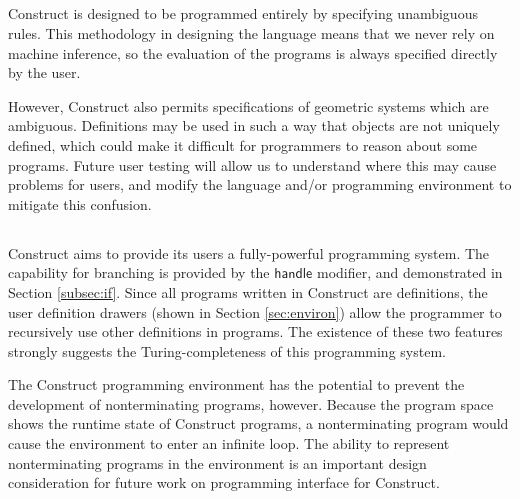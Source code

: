 \documentclass[twoside,openright,11pt]{report}
\begin{document}
\subsection{\constructgoalsnoinfer}

Construct is designed to be programmed entirely by specifying unambiguous rules.
This methodology in designing the language means that we never rely on machine inference, so the evaluation of the programs is always specified directly by the user.

However, Construct also permits specifications of geometric systems which are ambiguous. 
Definitions may be used in such a way that objects are not uniquely defined, which could make it difficult for programmers to reason about some programs. 
Future user testing will allow us to understand where this may cause problems for users, and modify the language and/or programming environment to mitigate this confusion.

\subsection{\constructgoalscomplete}

Construct aims to provide its users a fully-powerful programming system. 
The capability for branching is provided by the $\mathsf{handle}$ modifier, and demonstrated in Section \ref{subsec:if}. 
Since all programs written in Construct are definitions, the user definition drawers (shown in Section \ref{sec:environ}) allow the programmer to recursively use other definitions in programs.
The existence of these two features strongly suggests the Turing-completeness of this programming system.

The Construct programming environment has the potential to prevent the development of nonterminating programs, however. 
Because the program space shows the runtime state of Construct programs, a nonterminating program would cause the environment to enter an infinite loop.
The ability to represent nonterminating programs in the environment is an important design consideration for future work on programming interface for Construct.

\appendix



\end{document}
